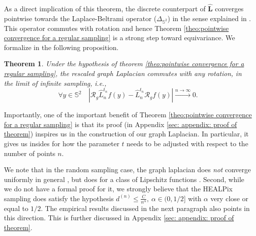 \documentclass{article} %
\newtheorem{theorem}{Theorem}[section]
\renewcommand{\S}{\mathbb{S}}
\newcommand{\todo}[1]{{\color[rgb]{.6,.1,.6}{#1}}}
\newcommand{\linefrac}[2]{
    {#1/#2}
}
\begin{document}
As a direct implication of this theorem, the discrete counterpart of $ \mathbf{\hat L}$ converges pointwise towards the Laplace-Beltrami operator ($\Delta_{\S^2}$) in the sense explained in \citep{belkin2007convergence}. This operator commutes with rotation and hence Theorem \ref{theo:pointwise convergence for a regular sampling} is a strong step toward equivariance. We formalize in the following proposition.
\begin{theorem}\label{theo:equivariance}
Under the hypothesis of theorem \ref{theo:pointwise convergence for a regular sampling}, the rescaled graph Laplacian commutes with any rotation, in the limit of infinite sampling, i.e.,
\begin{equation*}
\forall y\in\mathbb S^2\quad\left| \mathcal R_g \hat L_n^{t_n} f (y) - \hat L_n^{t_n} \mathcal R_g f(y) \right| \xrightarrow{n\to\infty}0.
\end{equation*}
\end{theorem}

Importantly, one of the important benefit of Theorem \ref{theo:pointwise convergence for a regular sampling} is that its proof (in Appendix \ref{sec: appendix: proof of theorem}) inspires us in the construction of our graph Laplacian.
In particular, it gives us insides for how the parameter $t$ needs to be adjusted with respect to the number of points $n$.

We note that in the random sampling case, the graph laplacian does \emph{not} converge uniformly in general \cite[Sec. 3]{belkin2007convergence}, but does for a class of Lipschitz functions \cite[Sec. 6]{belkin2005towards}.
Second, while we do not have a formal proof for it, we strongly believe that the HEALPix sampling does satisfy the hypothesis $d^{(n)}\leq \frac{C}{n^\alpha}, \ \alpha\in (0,\linefrac{1}{2}]$ with $\alpha$ very close or equal to $\linefrac{1}{2}$. The empirical results discussed in the next paragraph also points in this direction. This is further discussed in Appendix \ref{sec: appendix: proof of theorem}.
\end{document}
